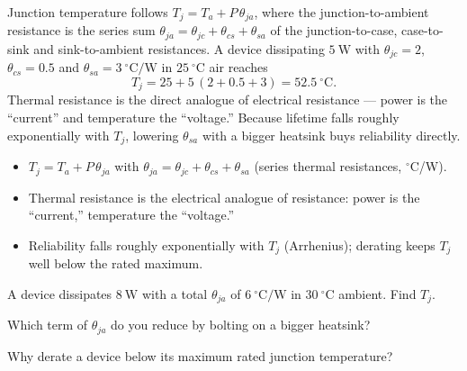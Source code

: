 \begin{workedexample}
Junction temperature follows $T_j = T_a + P\,\theta_{ja}$, where the
junction-to-ambient resistance is the series sum
$\theta_{ja} = \theta_{jc} + \theta_{cs} + \theta_{sa}$ of the junction-to-case,
case-to-sink and sink-to-ambient resistances. A device dissipating $5\ \text{W}$
with $\theta_{jc}=2$, $\theta_{cs}=0.5$ and $\theta_{sa}=3\ ^\circ\text{C/W}$ in
$25\ ^\circ\text{C}$ air reaches
\[ T_j = 25 + 5\,(2+0.5+3) = 52.5\ ^\circ\text{C}. \]
Thermal resistance is the direct analogue of electrical resistance --- power is the
``current'' and temperature the ``voltage.'' Because lifetime falls roughly
exponentially with $T_j$, lowering $\theta_{sa}$ with a bigger heatsink buys
reliability directly.
\end{workedexample}

\begin{keytakeaways}
\begin{itemize}[leftmargin=1.4em,itemsep=2pt]
\item $T_j = T_a + P\,\theta_{ja}$ with $\theta_{ja} = \theta_{jc} + \theta_{cs} + \theta_{sa}$ (series thermal resistances, $^\circ$C/W).
\item Thermal resistance is the electrical analogue of resistance: power is the ``current,'' temperature the ``voltage.''
\item Reliability falls roughly exponentially with $T_j$ (Arrhenius); derating keeps $T_j$ well below the rated maximum.
\end{itemize}
\end{keytakeaways}

\begin{exercises}
\item A device dissipates $8\ \text{W}$ with a total $\theta_{ja}$ of $6\ ^\circ\text{C/W}$ in $30\ ^\circ\text{C}$ ambient. Find $T_j$.
\item Which term of $\theta_{ja}$ do you reduce by bolting on a bigger heatsink?
\item Why derate a device below its maximum rated junction temperature?
\end{exercises}

